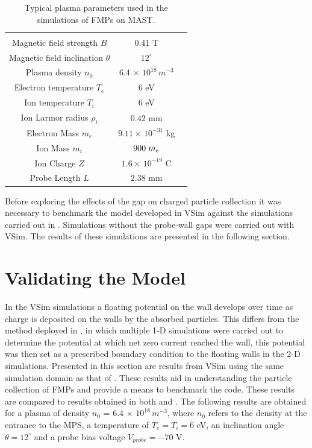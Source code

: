 \begin{table}[]
	\centering

	\begin{tabular}{c|c|c}  %
		 &  &  \\ %
		Magnetic field strength $B$             & 0.41 T                                               \\
		Magnetic field inclination $\theta$                & $12^{\circ} $      \\
		Plasma density $n_0$               & $6.4 \, \times \, 10^{18} \, m^{-3}$ \\ 
		Electron temperature $T_e$ &      $ 6$ eV     \\ 
		Ion temperature  $T_i$ &     $6$ eV  \\  
		Ion Larmor radius $\rho_i$  &  $0.42$ mm  \\
		Electron Mass $m_e$ &  $9.11 \times \, 10^{-31}$ kg \\
		Ion Mass $m_i$ &  $900 \hspace{1mm} m_e$ \\
		Ion Charge $Z$ & $1.6 \times \, 10^{-19}$ C \\
		Probe Length $L$ & $2.38$ mm \\
	\end{tabular} 
		\caption{Typical plasma parameters used in the simulations of FMPs on MAST. }
		\label{tab:sim_parameters}
\end{table}




Before exploring the effects of the gap on charged particle collection it was necessary to benchmark the model developed in VSim against the simulations carried out in \cite{Bergmann-2002}. Simulations without the probe-wall gaps were carried out with VSim. The results of these simulations are presented in the following section. 

\section{Validating the Model}
\label{Section:benchmark}
In the VSim simulations a floating potential on the wall develops over time as charge is deposited on the walls by the absorbed particles. This differs from the method deployed in \cite{Bergmann-2002}, in which multiple 1-D simulations were carried out to determine the potential at which net zero current reached the wall, this potential was then set as a prescribed boundary condition to the floating walls in the 2-D simulations. 
Presented in this section are results from VSim using the same simulation domain as that of \cite{Bergmann-2002}. These results aid in understanding the particle collection of FMPs and provide a means to benchmark the code. These results are compared to results obtained in both \cite{bergmann_1994} and \cite{Bergmann-2002}. The following results are obtained for a plasma of density  $n_0$ = $6.4 \, \times \, 10^{18} \, m^{-3}$, where $n_0$ refers to the density at the entrance to the MPS, a temperature of $T_e = T_i = 6$ eV, an inclination angle $\theta = 12^{\circ}$ and a probe bias voltage $V_{probe} = - 70$ V.


